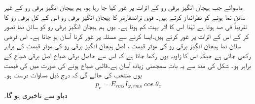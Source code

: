 ماسوائے جب  ہیجان انگیز برقی رو کے اثرات پر غور کیا جا رہا ہو، ہم ہیجان انگیز برقی رو کے غیر سائن نما ہونے کو نظرانداز کرتے ہیں۔ قوی ٹرانسفارمر کا  ہیجان انگیز برقی رو اس کے کل برقی رو کا تقریباً   فی صد  ہوتا ہے  لہٰذا  اس کا اثر بہت کم ہوتا ہے۔ یوں ہم  ہیجان انگیز برقی رو کو سائن نما تصور کر کے اس کے اثرات پر غور کرتے ہیں۔ایسا کرنے سے مسئلہ پر غور کرنا آسان ہو جاتا ہے۔ اس فرضی سائن نما  ہیجان انگیز برقی رو   کی موثر قیمت  ، اصل  ہیجان انگیز برقی رو کی موثر قیمت کے برابر رکھی جاتی ہے جبکہ اس کا زاویہ  یوں رکھا جاتا ہے کہ اس سے حاصل برقی ضیاع اصل برقی ضیاع کے برابر ہو۔ شکل   کی مدد سے یہ بات سمجھنی زیادہ آسان ہے۔قالبی ضیاع  ہونے کی صورت میں  کی قیمت یوں منتخب کی جائے گی کہ درج ذیل مساوات درست ہو۔
\begin{align}
p_c=E_{rms} I_{\varphi,rms} \cos \theta_c
\end{align}
 دباو   سے   تاخیری ہو گا۔

